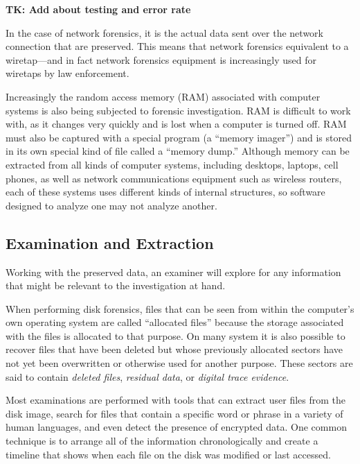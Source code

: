 \documentclass[11pt,letter]{article}
\begin{document}
\textbf{TK: Add about testing and error rate}

  In the case of network forensics, it is the actual data
  sent over the network connection that are preserved. This means that network forensics
  equivalent to a wiretap---and in fact network forensics equipment is
  increasingly used for wiretaps by law enforcement. 


  Increasingly the random access memory (RAM) associated with computer
  systems is also being subjected to forensic investigation. RAM is
  difficult to work with, as it changes very quickly and is lost when
  a computer is turned off. RAM must also be captured with a special
  program (a ``memory imager'') and is stored in its own special kind
  of file called a ``memory dump.'' Although memory can be extracted from all
  kinds of computer systems, including desktops, laptops, cell phones,
  as well as network communications equipment such as wireless
  routers, each of these systems uses different kinds of internal
  structures, so software designed to analyze one may not analyze another.


\subsection{Examination and Extraction} Working with the preserved data, an
  examiner will explore for any information that might be
  relevant to the investigation at hand. 

  When performing disk forensics, files that can be seen from within
  the computer's own operating system are called ``allocated files''
  because the storage associated with the files is allocated to that
  purpose. On many system it is also possible to recover files that have
  been deleted but whose previously allocated sectors have not yet
  been overwritten or otherwise used for another purpose. These
  sectors are said to contain \emph{deleted files}, \emph{residual data}, or
  \emph{digital trace evidence}.

Most examinations are performed
  with tools that can extract user files from the disk image, search for files that contain a specific word or phrase
  in a variety of human languages, and even detect the presence of
  encrypted data. One common technique is to arrange all of the
  information chronologically and create a timeline that shows when
  each file on the disk was modified or last accessed.
\end{document}
